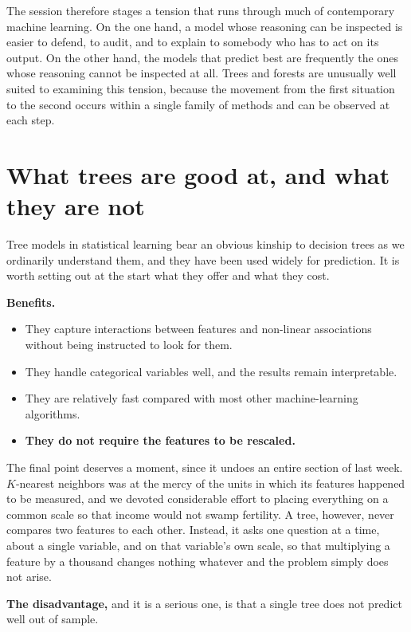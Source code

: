 \documentclass[
  a4paper,
]{scrbook}
\providecommand{\tightlist}{%
  \setlength{\itemsep}{0pt}\setlength{\parskip}{0pt}}
\begin{document}
The session therefore stages a tension that runs through much of
contemporary machine learning. On the one hand, a model whose reasoning
can be inspected is easier to defend, to audit, and to explain to
somebody who has to act on its output. On the other hand, the models
that predict best are frequently the ones whose reasoning cannot be
inspected at all. Trees and forests are unusually well suited to
examining this tension, because the movement from the first situation to
the second occurs within a single family of methods and can be observed
at each step.

\section{What trees are good at, and what they are
not}\label{what-trees-are-good-at-and-what-they-are-not}

Tree models in statistical learning bear an obvious kinship to decision
trees as we ordinarily understand them, and they have been used widely
for prediction. It is worth setting out at the start what they offer and
what they cost.

\textbf{Benefits.}

\begin{itemize}
\tightlist
\item
  They capture interactions between features and non-linear associations
  without being instructed to look for them.
\item
  They handle categorical variables well, and the results remain
  interpretable.
\item
  They are relatively fast compared with most other machine-learning
  algorithms.
\item
  \textbf{They do not require the features to be rescaled.}
\end{itemize}

The final point deserves a moment, since it undoes an entire section of
last week. \(K\)-nearest neighbors was at the mercy of the units in
which its features happened to be measured, and we devoted considerable
effort to placing everything on a common scale so that income would not
swamp fertility. A tree, however, never compares two features to each
other. Instead, it asks one question at a time, about a single variable,
and on that variable's own scale, so that multiplying a feature by a
thousand changes nothing whatever and the problem simply does not arise.

\textbf{The disadvantage,} and it is a serious one, is that a single
tree does not predict well out of sample.
\end{document}
